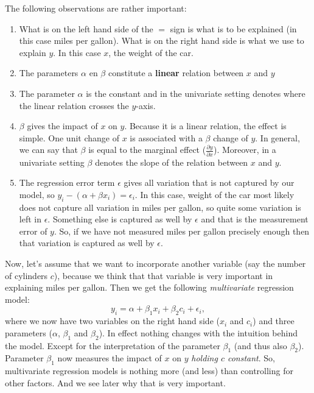 \documentclass[]{article}
\providecommand{\tightlist}{%
  \setlength{\itemsep}{0pt}\setlength{\parskip}{0pt}}
\begin{document}
The following observations are rather important:

\begin{enumerate}
\def\labelenumi{\arabic{enumi}.}
\tightlist
\item
  What is on the left hand side of the \(=\) sign is what is to be
  explained (in this case miles per gallon). What is on the right hand
  side is what we use to explain \(y\). In this case \(x\), the weight
  of the car.
\item
  The parameters \(\alpha\) en \(\beta\) constitute a \textbf{linear}
  relation between \(x\) and \(y\)
\item
  The parameter \(\alpha\) is the constant and in the univariate setting
  denotes where the linear relation crosses the \(y\)-axis.
\item
  \(\beta\) gives the impact of \(x\) on \(y\). Because it is a linear
  relation, the effect is simple. One unit change of \(x\) is associated
  with a \(\beta\) change of \(y\). In general, we can say that
  \(\beta\) is equal to the marginal effect
  (\(\frac{\partial y}{\partial x}\)). Moreover, in a univariate setting
  \(\beta\) denotes the slope of the relation between \(x\) and \(y\).
\item
  The regression error term \(\epsilon\) gives all variation that is not
  captured by our model, so \(y_i -(\alpha + \beta x_i) = \epsilon_i\).
  In this case, weight of the car most likely does not capture all
  variation in miles per gallon, so quite some variation is left in
  \(\epsilon\). Something else is captured as well by \(\epsilon\) and
  that is the measurement error of \(y\). So, if we have not measured
  miles per gallon precisely enough then that variation is captured as
  well by \(\epsilon\).
\end{enumerate}

Now, let's assume that we want to incorporate another variable (say the
number of cylinders \(c\)), because we think that that variable is very
important in explaining miles per gallon. Then we get the following
\emph{multivariate} regression model: \[
y_i = \alpha + \beta_1 x_i + \beta_2 c_i + \epsilon_i,
\] where we now have two variables on the right hand side (\(x_i\) and
\(c_i\)) and three parameters (\(\alpha\), \(\beta_1\) and \(\beta_2\)).
In effect nothing changes with the intuition behind the model. Except
for the interpretation of the parameter \(\beta_1\) (and thus also
\(\beta_2\)). Parameter \(\beta_1\) now measures the impact of \(x\) on
\(y\) \emph{holding \(c\) constant}. So, multivariate regression models
is nothing more (and less) than controlling for other factors. And we
see later why that is very important.
\end{document}
